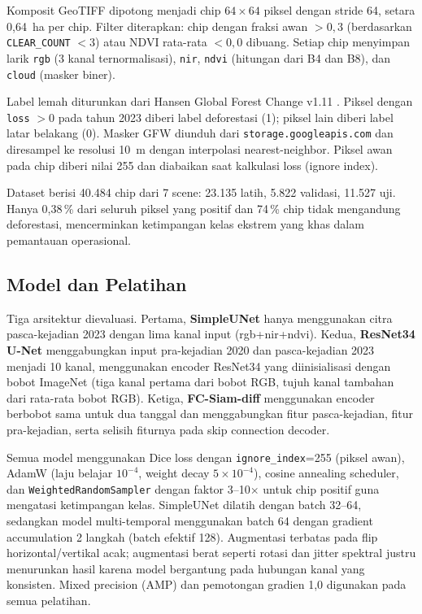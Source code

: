 \documentclass[10pt,a4paper,onecolumn]{article}
\begin{document}
Komposit GeoTIFF dipotong menjadi chip $64\times64$ piksel dengan
stride 64, setara 0,64~ha per chip. Filter diterapkan: chip dengan
fraksi awan $>0{,}3$ (berdasarkan \texttt{CLEAR\_COUNT} $<3$) atau
NDVI rata-rata $<0{,}0$ dibuang. Setiap chip menyimpan larik
\texttt{rgb} (3 kanal ternormalisasi), \texttt{nir}, \texttt{ndvi}
(hitungan dari B4 dan B8), dan \texttt{cloud} (masker biner).

Label lemah diturunkan dari Hansen Global Forest Change v1.11
\cite{hansen2013high}. Piksel dengan \texttt{loss} $>0$ pada tahun
2023 diberi label deforestasi (1); piksel lain diberi label latar
belakang (0). Masker GFW diunduh dari \texttt{storage.googleapis.com}
dan diresampel ke resolusi 10~m dengan interpolasi nearest-neighbor.
Piksel awan pada chip diberi nilai 255 dan diabaikan saat kalkulasi
loss (ignore index).

Dataset berisi 40.484 chip dari 7 scene: 23.135 latih, 5.822 validasi,
11.527 uji. Hanya 0,38\,\% dari seluruh piksel yang positif dan 74\,\%
chip tidak mengandung deforestasi, mencerminkan ketimpangan kelas
ekstrem yang khas dalam pemantauan operasional.

\subsection{Model dan Pelatihan}
Tiga arsitektur dievaluasi. Pertama, \textbf{SimpleUNet} \cite{ronneberger2015unet}
hanya menggunakan citra pasca-kejadian 2023 dengan lima kanal input
(rgb+nir+ndvi). Kedua, \textbf{ResNet34 U-Net} \cite{he2016deep}
menggabungkan input pra-kejadian 2020 dan pasca-kejadian 2023 menjadi
10 kanal, menggunakan encoder ResNet34 yang diinisialisasi dengan bobot
ImageNet (tiga kanal pertama dari bobot RGB, tujuh kanal tambahan dari
rata-rata bobot RGB). Ketiga, \textbf{FC-Siam-diff} \cite{daudt2018fcsiam}
menggunakan encoder berbobot sama untuk dua tanggal dan menggabungkan
fitur pasca-kejadian, fitur pra-kejadian, serta selisih fiturnya pada
skip connection decoder.

Semua model menggunakan Dice loss \cite{milletari2016vnet} dengan
\texttt{ignore\_index}=255 (piksel awan), AdamW \cite{loshchilov2019decoupled}
(laju belajar $10^{-4}$, weight decay $5\times10^{-4}$), cosine annealing
scheduler, dan \texttt{WeightedRandomSampler} dengan faktor 3--10$\times$
untuk chip positif guna mengatasi ketimpangan kelas. SimpleUNet dilatih
dengan batch 32--64, sedangkan model multi-temporal menggunakan batch 64
dengan gradient accumulation 2 langkah (batch efektif 128). Augmentasi
terbatas pada flip horizontal/vertikal acak; augmentasi berat seperti
rotasi dan jitter spektral justru menurunkan hasil karena model bergantung
pada hubungan kanal yang konsisten. Mixed precision (AMP) dan pemotongan
gradien 1,0 digunakan pada semua pelatihan.
\end{document}
